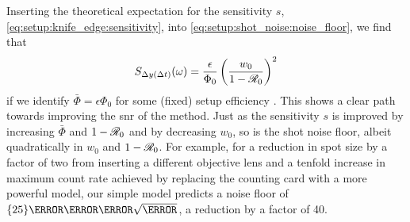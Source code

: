 Inserting the theoretical expectation for the sensitivity $s$, \cref{eq:setup:knife_edge:sensitivity}, into \cref{eq:setup:shot_noise:noise_floor}, we find that
\begin{equation}\label{eq:setup:shot_noise:noise_floor2}
    S_{\Delta y(\Delta t)}(\omega) = \frac{\epsilon}{\Phi_0}\left(\frac{w_0}{1-\mathscr{R}_0}\right)^2
\end{equation}
if we identify $\bar{\Phi} = \epsilon\Phi_0$ for some (fixed) setup efficiency \eps.
This shows a clear path towards improving the \gls{snr} of the method.
Just as the sensitivity $s$ is improved by increasing $\bar{\Phi}$ and $1-\mathscr{R}_0$ and by decreasing $w_0$, so is the shot noise floor, albeit quadratically in $w_0$ and $1-\mathscr{R}_0$.
For example, for a reduction in spot size by a factor of two from inserting a different objective lens and a tenfold increase in maximum count rate achieved by replacing the counting card with a more powerful model,
our simple model predicts a noise floor of $\qty{25}{\pico\meter\per\sqrt{\hertz}}$, a reduction by a factor of \num{40}.

